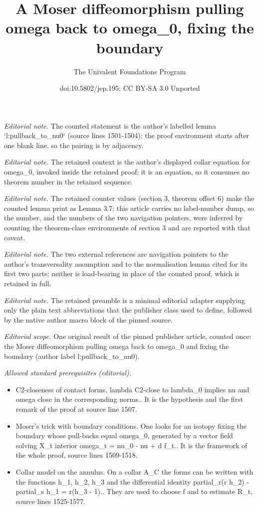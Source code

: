 \documentclass[10pt,a4paper]{article}
\title{A Moser diffeomorphism pulling omega back to omega\_0, fixing the boundary}
\author{The Univalent Foundations Program}
\date{doi:10.5802/jep.195; CC BY-SA 3.0 Unported}
\theoremstyle{definition}
\begin{document}
\maketitle
\setcounter{section}{3}
\setcounter{thm}{6}
\noindent\textit{Editorial note.} The counted statement is the author's labelled lemma `l:pullback\_to\_nu0` (source lines 1501-1504); the proof environment starts after one blank line, so the pairing is by adjacency.\par\medskip
\noindent\textit{Editorial note.} The retained context is the author's displayed collar equation for omega\_0, invoked inside the retained proof; it is an equation, so it consumes no theorem number in the retained sequence.\par\medskip
\noindent\textit{Editorial note.} The retained counter values (section 3, theorem offset 6) make the counted lemma print as Lemma 3.7; this article carries no label-number dump, so the number, and the numbers of the two navigation pointers, were inferred by counting the theorem-class environments of section 3 and are reported with that caveat.\par\medskip
\noindent\textit{Editorial note.} The two external references are navigation pointers to the author's transversality assumption and to the normalisation lemma cited for its first two parts; neither is load-bearing in place of the counted proof, which is retained in full.\par\medskip
\noindent\textit{Editorial note.} The retained preamble is a minimal editorial adapter supplying only the plain text abbreviations that the publisher class used to define, followed by the native author macro block of the pinned source.\par\medskip
\noindent\textit{Editorial scope.} One original result of the pinned publisher article, counted once: the Moser diffeomorphism pulling omega back to omega\_0 and fixing the boundary (author label l:pullback\_to\_nu0).\par\medskip
\noindent\textit{Allowed standard prerequisites (editorial).}\begin{itemize}
\item C2-closeness of contact forms. lambda C2-close to lambda\_0 implies nu and omega close in the corresponding norms.. It is the hypothesis and the first remark of the proof at source line 1507.
\item Moser's trick with boundary conditions. One looks for an isotopy fixing the boundary whose pull-backs equal omega\_0, generated by a vector field solving X\_t interior omega\_t = nu\_0 - nu + d f\_t.. It is the framework of the whole proof, source lines 1509-1518.
\item Collar model on the annulus. On a collar A\_C the forms can be written with the functions h\_1, h\_2, h\_3 and the differential identity partial\_r(r h\_2) - partial\_s h\_1 = r(h\_3 - 1).. They are used to choose f and to estimate R\_t, source lines 1525-1577.
\end{itemize}\medskip
\end{document}

